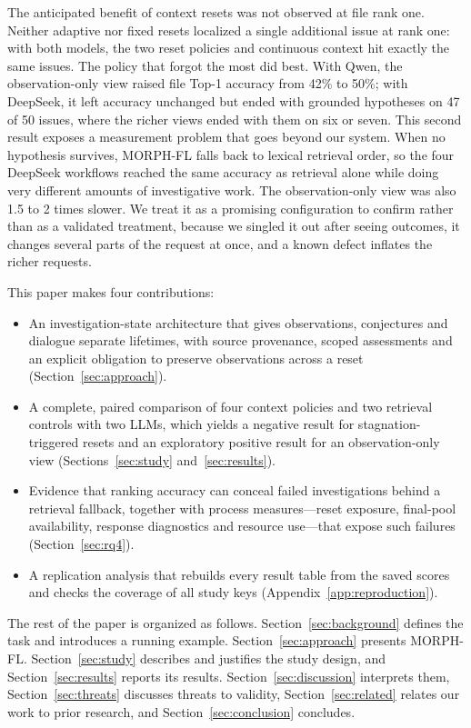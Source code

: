 \documentclass[a4paper,fleqn]{cas-sc}
\newcommand{\tool}{MORPH-FL}
\begin{document}
The anticipated benefit of context resets was not observed at file rank one. Neither adaptive nor fixed resets localized a single additional issue at rank one: with both models, the two reset policies and continuous context hit exactly the same issues. The policy that forgot the most did best. With Qwen, the observation-only view raised file Top-1 accuracy from 42\% to 50\%; with DeepSeek, it left accuracy unchanged but ended with grounded hypotheses on 47 of 50 issues, where the richer views ended with them on six or seven. This second result exposes a measurement problem that goes beyond our system. When no hypothesis survives, \tool{} falls back to lexical retrieval order, so the four DeepSeek workflows reached the same accuracy as retrieval alone while doing very different amounts of investigative work. The observation-only view was also 1.5 to 2 times slower. We treat it as a promising configuration to confirm rather than as a validated treatment, because we singled it out after seeing outcomes, it changes several parts of the request at once, and a known defect inflates the richer requests.

This paper makes four contributions:
\begin{itemize}
\item An investigation-state architecture that gives observations, conjectures and dialogue separate lifetimes, with source provenance, scoped assessments and an explicit obligation to preserve observations across a reset (Section~\ref{sec:approach}).
\item A complete, paired comparison of four context policies and two retrieval controls with two LLMs, which yields a negative result for stagnation-triggered resets and an exploratory positive result for an observation-only view (Sections~\ref{sec:study} and~\ref{sec:results}).
\item Evidence that ranking accuracy can conceal failed investigations behind a retrieval fallback, together with process measures---reset exposure, final-pool availability, response diagnostics and resource use---that expose such failures (Section~\ref{sec:rq4}).
\item A replication analysis that rebuilds every result table from the saved scores and checks the coverage of all study keys (Appendix~\ref{app:reproduction}).
\end{itemize}

The rest of the paper is organized as follows. Section~\ref{sec:background} defines the task and introduces a running example. Section~\ref{sec:approach} presents \tool{}. Section~\ref{sec:study} describes and justifies the study design, and Section~\ref{sec:results} reports its results. Section~\ref{sec:discussion} interprets them, Section~\ref{sec:threats} discusses threats to validity, Section~\ref{sec:related} relates our work to prior research, and Section~\ref{sec:conclusion} concludes.
\end{document}
